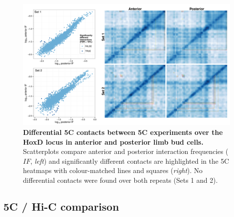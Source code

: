 \documentclass[a4paper,11pt,oneside]{book}
\begin{document}

\begin{figure}
\begin{center} 
\includegraphics[width=\textwidth]{figs/5cdiff.pdf}
\captionsetup{width=\textwidth} 
\caption[Differential 5C contacts between 5C experiments over the HoxD locus in anterior and posterior limb bud cells.]{ {\bf Differential 5C contacts between 5C experiments over the HoxD locus in anterior and posterior limb bud cells. }
Scatterplots compare anterior and posterior interaction frequencies ($IF$, \emph{left}) and significantly different contacts are highlighted in the 5C heatmaps with colour-matched lines and squares (\emph{right}). No differential contacts were found over both repeats (Sets 1 and 2).
}\label{fig:5cdiff}
\end{center} 
\end{figure} 


\subsection{5C / Hi-C comparison}

\end{document}
